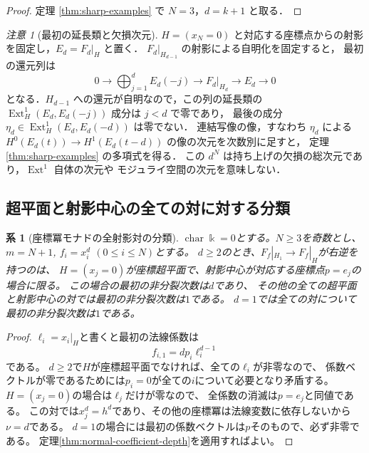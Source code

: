 \documentclass[a4paper,11pt]{ltjsarticle}
\numberwithin{equation}{section}
\theoremstyle{plain}
\newtheorem{corollary}[theorem]{系}
\theoremstyle{definition}
\theoremstyle{remark}
\newtheorem{remark}[theorem]{注意}
\begin{document}
\begin{proof}
定理 \ref{thm:sharp-examples} で $N=3$，$d=k+1$ と取る．
\end{proof}

\begin{remark}[最初の延長類と欠損次元]
$H=(x_N=0)$ と対応する座標点からの射影を固定し，$E_d=F_d|_H$ と置く．
$F_d|_{H_{d-1}}$ の射影による自明化を固定すると，
最初の還元列は
\[
 0\longrightarrow\bigoplus_{j=1}^{d}E_d(-j)
 \longrightarrow F_d|_{H_d}\longrightarrow E_d\longrightarrow0
\]
となる．$H_{d-1}$ への還元が自明なので，この列の延長類の
$\operatorname{Ext}^1_H(E_d,E_d(-j))$ 成分は $j<d$ で零であり，
最後の成分 $\eta_d\in\operatorname{Ext}^1_H(E_d,E_d(-d))$ は零でない．
連結写像の像，すなわち $\eta_d$ による
$H^0(E_d(t))\to H^1(E_d(t-d))$ の像の次元を次数別に足すと，
定理 \ref{thm:sharp-examples} の多項式を得る．
この $d^N$ は持ち上げの欠損の総次元であり，$\operatorname{Ext}^1$ 自体の次元や
モジュライ空間の次元を意味しない．
\end{remark}

\subsection{超平面と射影中心の全ての対に対する分類}

\begin{corollary}[座標冪モナドの全射影対の分類]
\label{cor:coordinate-power-full-retractions}
$\operatorname{char}\Bbbk=0$とする。$N\geq3$を奇数とし、$m=N+1$,
$f_i=x_i^d$ $(0\leq i\leq N)$とする。
$d\geq2$のとき、$F_f|_{H_1}\to F_f|_H$が右逆を持つのは、
$H=(x_j=0)$が座標超平面で、射影中心が対応する座標点$p=e_j$の場合に限る。
この場合の最初の非分裂次数は$d$であり、
その他の全ての超平面と射影中心の対では最初の非分裂次数は$1$である。
$d=1$では全ての対について最初の非分裂次数は$1$である。
\end{corollary}

\begin{proof}
$\ell_i=x_i|_H$と書くと最初の法線係数は
\[
 f_{i,1}=d p_i\ell_i^{d-1}
\]
である。
$d\geq2$で$H$が座標超平面でなければ、全ての$\ell_i$が非零なので、
係数ベクトルが零であるためには$p_i=0$が全ての$i$について必要となり矛盾する。
$H=(x_j=0)$の場合は$\ell_j$だけが零なので、
全係数の消滅は$p=e_j$と同値である。
この対では$x_j^d=h^d$であり、その他の座標冪は法線変数に依存しないから$\nu=d$である。
$d=1$の場合には最初の係数ベクトルは$p$そのもので、必ず非零である。
定理\ref{thm:normal-coefficient-depth}を適用すればよい。
\end{proof}
\end{document}
